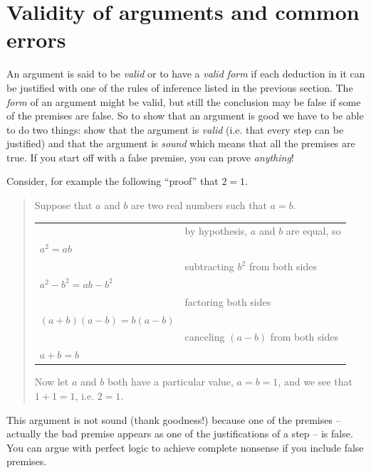 \newpage




\newpage

\section{Validity of arguments and common errors}
\label{sec:valid}

An argument is said to be \emph{valid} or to have a 
\emph{valid form} 
if each deduction in it can be justified with one of the rules
of inference listed in the previous section.  The \emph{form} of 
an argument might be valid, but still the conclusion may be false
if some of the premises are false.  So to show that an argument is
good we have to be able to do two things: show that the argument 
is \emph{valid} (i.e. that every step can be justified) and that 
the argument is 
\emph{sound} 
which means that all the premises are
true.  If you start off with a false premise, you can prove \emph{anything}!

Consider, for example the following ``proof'' that $2=1$.

\begin{quote}
  Suppose that $a$ and $b$ are two real numbers such that $a=b$.

\begin{center}
\begin{tabular}{p{2in}p{2in}}
 & by hypothesis, $a$ and $b$ are equal, so\\
 $a^2 = ab$ & \\
 & subtracting $b^2$ from both sides\\
 $a^2 - b^2 = ab - b^2$& \\
 & factoring both sides\\
 $(a+b)(a-b) = b(a-b)$ & \\
 & canceling $(a-b)$ from both sides\\
 $a+b = b$ & \\
\end{tabular}
\end{center}
\medskip
Now let $a$ and $b$ both have a particular value, $a=b=1$,
and we see that $1+1=1$, i.e. $2=1$.
\end{quote}

This argument is not sound (thank goodness!) because one of the
premises -- actually the bad premise appears as one of the 
justifications of a step -- is false.  You can argue with
perfect logic to achieve complete nonsense if you include 
false premises.

